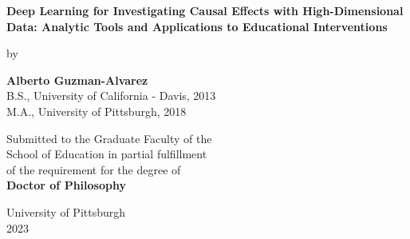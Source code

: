 
   \begin{center}

        \textbf{Deep Learning for Investigating Causal Effects with High-Dimensional Data: Analytic Tools and Applications to Educational Interventions}
            
       \vspace*{7\baselineskip}
        by
            
        \textbf{Alberto Guzman-Alvarez}\\
        B.S., University of California - Davis, 2013\\
        M.A., University of Pittsburgh, 2018\\
        
       \vspace*{8\baselineskip}
        
        Submitted to the Graduate Faculty of the\\
        School of Education in partial fulfillment\\
        of the requirement for the degree of\\
        \textbf{Doctor of Philosophy}
            
       \vspace*{3\baselineskip}

        University of Pittsburgh\\ 
        2023
    \end{center}

	
	